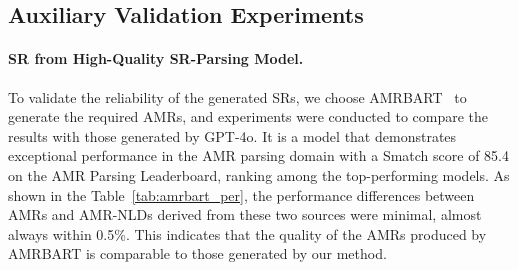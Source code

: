 \subsection{Auxiliary Validation Experiments}

\paragraph{SR from High-Quality SR-Parsing Model.}
To validate the reliability of the generated SRs, we choose AMRBART~\cite{bai2022graph} to generate the required AMRs, and experiments were conducted to compare the results with those generated by GPT-4o. It is a model that demonstrates exceptional performance in the AMR parsing domain with a Smatch score of 85.4 on the AMR Parsing Leaderboard, ranking among the top-performing models.  As shown in the Table~\ref{tab:amrbart_per}, the performance differences between AMRs and AMR-NLDs derived from these two sources were minimal, almost always within 0.5\%. This indicates that the quality of the AMRs produced by AMRBART is comparable to those generated by our method. 


